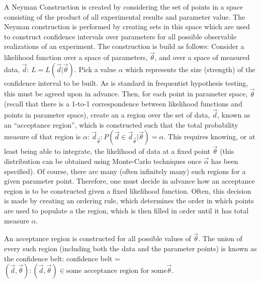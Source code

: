 A Neyman Construction is created by considering the set of points in a space consisting of the product of all experimental results and parameter value.
The Neyman construction is performed by creating sets in this space which are used to construct confidence intervals over parameters for all possible observable realizations of an experiment.
The construction is build as follows:
Consider a likelihood function over a space of parameters, $\vec{\theta}$, and over a space of measured data, $\vec{d}$: $L = L(\vec{d} | \vec{\theta} )$.
Pick a value $\alpha$ which represents the size (strength) of the confidence interval to be built.
As is standard in frequentist hypothesis testing, this must be agreed upon in advance.
Then, for each point in parameter space, $\vec{ \theta }$ (recall that there is a 1-to-1 correspondence between likelihood functions and points in parameter space), create an a region over the set of data, ${ \vec{d} }$, known as an ``acceptance region'', which is constructed such that the total probability measure of that region is $\alpha$: ${ \vec{d}_{ \vec{ \theta } } : P( \vec{d} \in \vec{d}_{ \vec{ \theta } } | \vec{ \theta } ) = \alpha }$.
This requires knowing, or at least being able to integrate, the likelihood of data at a fixed point $\vec{\theta}$ (this distribution can be obtained using Monte-Carlo techniques once $\vec{\alpha}$ has been specified).
Of course, there are many (often infinitely many) such regions for a given parameter point.
Therefore, one must decide in advance how an acceptance region is to be constructed given a fixed likelihood function.
Often, this decision is made by creating an ordering rule, which determines the order in which points are used to populate a the region, which is then filled in order until it has total measure $\alpha$.

An acceptance region is constructed for all possible values of $\vec{\theta}$.
The union of every such region (including both the data and the parameter points) is known as the confidence belt: confidence belt = ${ ( \vec{d}, \vec{ \theta }) : ( \vec{d}, \vec{ \theta }) \in \mbox{some acceptance region for some} \vec{ \theta } }$.

